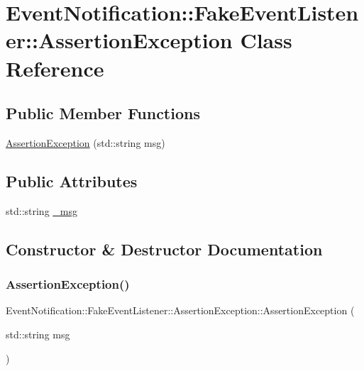 \hypertarget{classEventNotification_1_1FakeEventListener_1_1AssertionException}{}\section{Event\+Notification\+::Fake\+Event\+Listener\+::Assertion\+Exception Class Reference}
\label{classEventNotification_1_1FakeEventListener_1_1AssertionException}
\subsection*{Public Member Functions}
\begin{DoxyCompactItemize}
\item 
\mbox{\hyperlink{classEventNotification_1_1FakeEventListener_1_1AssertionException_a58f13f16e88d6384a7aa2a4384a491ae}{Assertion\+Exception}} (std\+::string msg)
\end{DoxyCompactItemize}
\subsection*{Public Attributes}
\begin{DoxyCompactItemize}
\item 
std\+::string \mbox{\hyperlink{classEventNotification_1_1FakeEventListener_1_1AssertionException_a9b437435c5af2336d7d1018aa4ff7aea}{\+\_\+msg}}
\end{DoxyCompactItemize}


\subsection{Constructor \& Destructor Documentation}
\mbox{\label{classEventNotification_1_1FakeEventListener_1_1AssertionException_a58f13f16e88d6384a7aa2a4384a491ae}} 
\subsubsection{\texorpdfstring{AssertionException()}{AssertionException()}}
{\footnotesize\ttfamily Event\+Notification\+::\+Fake\+Event\+Listener\+::\+Assertion\+Exception\+::\+Assertion\+Exception (\begin{DoxyParamCaption}\item[{std\+::string}]{msg }\end{DoxyParamCaption})\hspace{0.3cm}{\ttfamily [inline]}}



